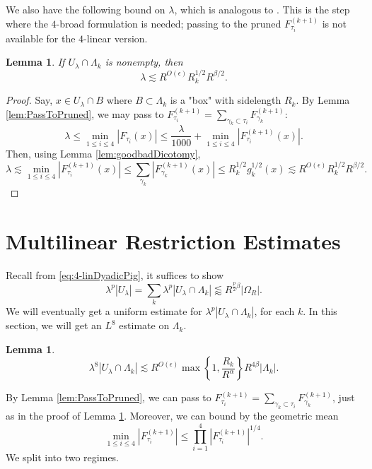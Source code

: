 \documentclass[12pt]{amsart}
\newtheorem{lemma}[theorem]{Lemma}
\begin{document}
We also have the following bound on $\lambda$, which is analogous to \cite[Lemma 4.1]{maldague2024smallcapdecouplingmoment}. This is the step where the $4$-broad formulation is needed; passing to the pruned $F_{\tau_i}^{(k+1)}$ is not available for the $4$-linear version.

\begin{lemma}\label{lem:upgrader}
    If $U_{\lambda}\cap \Lambda_k$ is nonempty, then $$\lambda\lesssim R^{O(\epsilon)}R_k^{1/2}R^{\beta/2}.$$
\end{lemma}

\begin{proof}
    Say, $x\in U_{\lambda}\cap B$ where $B\subset \Lambda_k$ is a "box" with sidelength $R_k$. By Lemma \ref{lem:PassToPruned}, we may pass to $F_{\tau_i}^{(k+1)}= \sum_{\gamma_k\subset \tau_i}F_{\gamma_k}^{(k+1)}$: $$\lambda\le \min_{1\le i\le 4}|F_{\tau_i}(x)|\le \frac{\lambda}{1000}+\min_{1\le i\le 4}|F_{\tau_i}^{(k+1)}(x)|.$$   Then, using Lemma \ref{lem:goodbadDicotomy}, $$\lambda\lesssim \min_{1\le i\le 4}|F_{\tau_i}^{(k+1)}(x)|\le\sum_{\gamma_k}|F_{\gamma_k}^{(k+1)}(x)|\le R_k^{1/2}g_k^{1/2}(x)\lesssim R^{O(\epsilon)}R_k^{1/2}R^{\beta/2}.$$
\end{proof}


\section{Multilinear Restriction Estimates}\label{sec:multRestriction}
Recall from \eqref{eq:4-linDyadicPig}, it suffices to show $$\lambda^p |U_{\lambda}|= \sum_{k}\lambda^p |U_{\lambda}\cap \Lambda_k|\lessapprox R^{\frac{p}{2}\beta}|\Omega_R|.$$ We will eventually get a uniform estimate for $\lambda^{p}|U_{\lambda}\cap \Lambda_k|$, for each $k$. In this section, we will get an $L^8$ estimate on $\Lambda_k$.

\begin{lemma}
    \begin{equation}\label{eq:restrictionConclusion}
    \lambda^8|U_{\lambda}\cap \Lambda_k| \lesssim R^{O(\epsilon)}\max\left\{1, \frac{R_k}{R^\alpha}\right\}R^{4\beta}|\Lambda_k|.
\end{equation}
\end{lemma}
%
\noindent By Lemma \ref{lem:PassToPruned}, we can pass to $F_{\tau_i}^{(k+1)}= \sum_{\gamma_k\subset \tau_i}F_{\gamma_k}^{(k+1)}$, just as in the proof of Lemma \ref{lem:upgrader}. Moreover, we can bound by the geometric mean $$\min_{1\le i\le 4}|F_{\tau_i}^{(k+1)}|\le \prod_{i=1}^4|F_{\tau_i}^{(k+1)}|^{1/4}.$$ We split into two regimes. 
\end{document}
